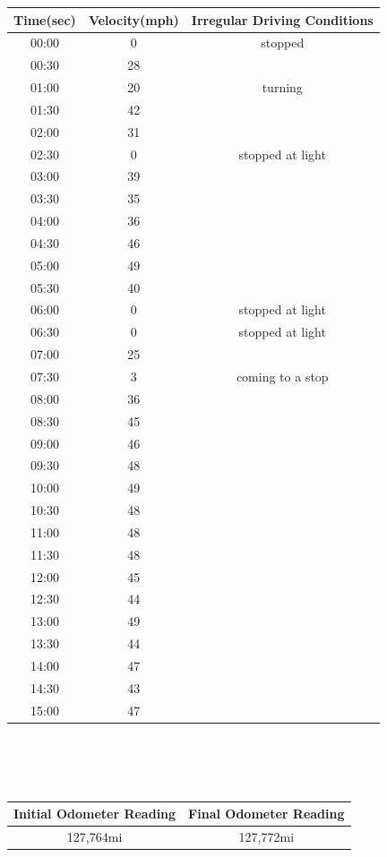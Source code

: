 \documentclass[12 pt]{article}
\begin{document}
\begin{tabular}{c|c|c}
 Time(sec) & Velocity(mph) & Irregular Driving Conditions \\
     \hline
   00:00 & 0 & stopped\\
   \hline
   00:30 & 28 &\\
   \hline
   01:00 & 20 & turning\\
   \hline
   01:30 & 42 &\\
   \hline
   02:00 & 31 &\\
   \hline
   02:30 & 0 & stopped at light\\
   \hline
   03:00 & 39 &\\
   \hline
   03:30 & 35 &\\
   \hline
   04:00 & 36 &\\
   \hline
   04:30 & 46 &\\
   \hline
   05:00 & 49 &\\
   \hline
   05:30 & 40 &\\
   \hline
   06:00 & 0 & stopped at light\\
   \hline
   06:30 & 0 & stopped at light\\
   \hline
   07:00 & 25 &\\
   \hline
   07:30 & 3 & coming to a stop\\
   \hline
   08:00 & 36 &\\
   \hline
   08:30 & 45 &\\
   \hline
   09:00 & 46 &\\
   \hline
   09:30 & 48 &\\
   \hline
   10:00 & 49 &\\
   \hline
   10:30 & 48 &\\
   \hline
   11:00 & 48 &\\
   \hline
   11:30 & 48 &\\
   \hline
   12:00 & 45 &\\
   \hline
   12:30 & 44 &\\
   \hline
   13:00 & 49 &\\
   \hline
   13:30 & 44 &\\
   \hline
   14:00 & 47 &\\
   \hline
   14:30 & 43 &\\
   \hline
   15:00 & 47 &\\
\end{tabular}\\\\\\
\begin{tabular}{c|c}
   Initial Odometer Reading  & Final Odometer Reading \\
   \hline
    127,764mi & 127,772mi\\
\end{tabular}\\
\end{document}
